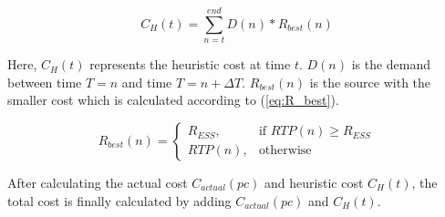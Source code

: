 \begin{equation}
\label{eq:C_H}
C_H(t) = \sum_{n=t}^{end} D(n)*R_{best}(n)
\end{equation}

Here, $C_H(t)$ represents the heuristic cost at time $t$. $D(n)$ is the demand between time $T = n$ and time $T = n+\Delta T$. $R_{best}(n)$ is the source with the smaller cost which is calculated according to (\ref{eq:R_best}).

\begin{equation}
\label{eq:R_best}
R_{best}(n) = 
\begin{cases}
    R_{ESS},& \text{if } RTP(n)\geq R_{ESS}\\
    RTP(n),              & \text{otherwise}
\end{cases}
\end{equation}

After calculating the actual cost  $C_{actual}(pc)$ and heuristic cost $C_H(t)$, the total cost is finally calculated by adding  $C_{actual}(pc)$ and $C_H(t)$.


